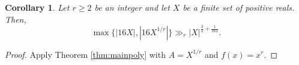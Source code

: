\documentclass[11pt]{amsart}
\newcommand{\R}{\mathbb{R}}
\newtheorem{corollary}[theorem]{Corollary}
\begin{document}
\begin{corollary}
    Let $r\ge2$ be an integer and let $X$ be a finite set of positive reals. Then,
\[
    \max \{ |16X|, |16X^{1/r}| \} \gg_r |X|^{\frac{3}{2}+ \frac{1}{162}}.
    \]
\end{corollary}
\begin{proof}
    Apply Theorem \ref{thm:mainpoly} with $A=X^{1/r}$ and $f(x)=x^r.$
\end{proof}
\end{document}
